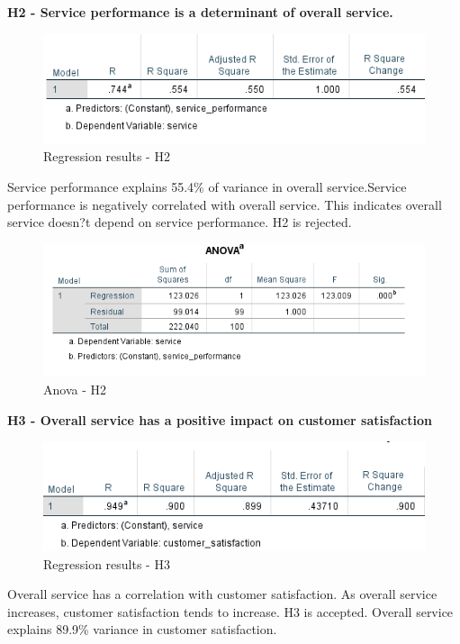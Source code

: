 \documentclass[a4paper, 12pt]{extarticle}
\begin{document}
{\par \textbf{H2 - Service performance is a determinant of overall service.}\\
\begin{figure}[H]
\centering
\includegraphics[scale=1]{service_performance_vs_service.png}
\caption{Regression results - H2}
\end{figure}

Service performance explains 55.4\% of variance in overall service.Service performance is negatively correlated with overall service. This indicates overall service doesn?t depend on service performance. H2 is rejected.

\begin{figure}[H]
\centering
\includegraphics[scale=1]{anova_s_sp.png}
\caption{Anova - H2}
\end{figure}

\par \textbf{H3 - Overall service has a positive impact on customer satisfaction}\\
\begin{figure}[H]
\centering
\includegraphics[scale=1]{sp_vs_cs.png}
\caption{Regression results - H3}
\end{figure}

Overall service has a correlation with customer satisfaction. As overall service increases, customer satisfaction tends to increase. H3 is accepted.
Overall service explains 89.9\% variance in customer satisfaction.

}
\end{document}

